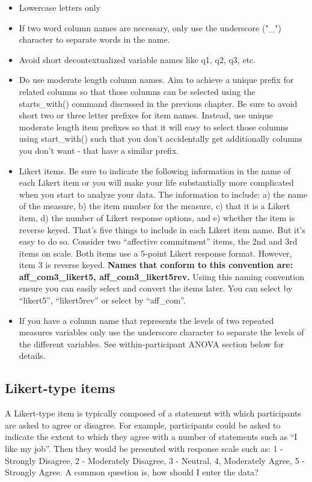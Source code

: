 \documentclass[
]{krantz}
\begin{document}
\begin{itemize}
\item
  Lowercase letters only
\item
  If two word column names are necessary, only use the underscore ("\_") character to separate words in the name.
\item
  Avoid short decontextualized variable names like q1, q2, q3, etc.
\item
  Do use moderate length column names. Aim to achieve a unique prefix for related columns so that those columns can be selected using the starts\_with() command discussed in the previous chapter. Be sure to avoid short two or three letter prefixes for item names. Instead, use unique moderate length item prefixes so that it will easy to select those columns using start\_with() such that you don't accidentally get additionally columns you don't want - that have a similar prefix.
\item
  Likert items. Be sure to indicate the following information in the name of each Likert item or you will make your life substantially more complicated when you start to analyze your data. The information to include: a) the name of the measure, b) the item number for the measure, c) that it is a Likert item, d) the number of Likert response options, and e) whether the item is reverse keyed. That's five things to include in each Likert item name. But it's easy to do so. Consider two ``affective commitment'' items, the 2nd and 3rd items on scale. Both items use a 5-point Likert response format. However, item 3 is reverse keyed. \textbf{Names that conform to this convention are: aff\_com3\_likert5, aff\_com3\_likert5rev.} Usiing this naming convention ensure you can easily select and convert the items later. You can select by ``likert5'', ``likert5rev'' or select by ``aff\_com''.
\item
  If you have a column name that represents the levels of two repeated measures variables only use the underscore character to separate the levels of the different variables. See within-participant ANOVA section below for details.
\end{itemize}

\hypertarget{likert-type-items}{%
\subsection{Likert-type items}\label{likert-type-items}}

A Likert-type item is typically composed of a statement with which participants are asked to agree or disagree. For example, participants could be asked to indicate the extent to which they agree with a number of statements such as ``I like my job''. Then they would be presented with response scale such as: 1 - Strongly Disagree, 2 - Moderately Disagree, 3 - Neutral, 4, Moderately Agree, 5 - Strongly Agree. A common question is, how should I enter the data?
\end{document}
